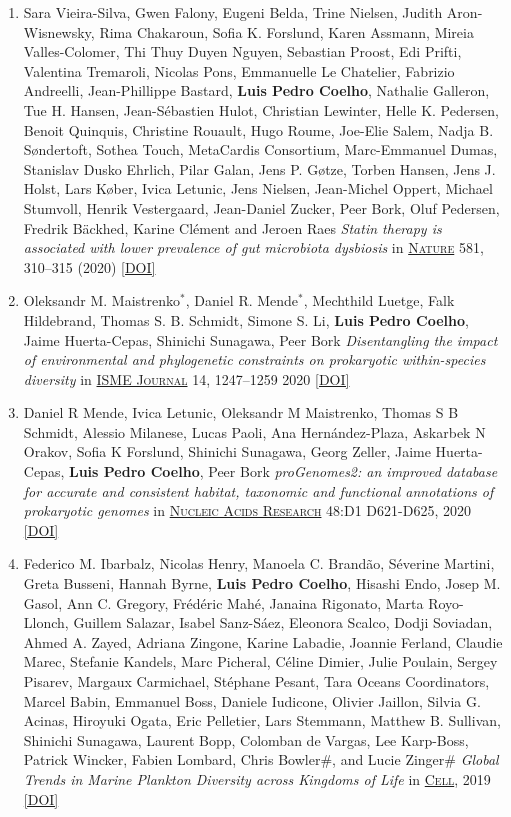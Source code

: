 \documentclass{article}
\newcommand\showdoi[1]{%
    \href{http://dx.doi.org/#1}{[DOI]}%
}
\newcommand\pubname[1]{\textsc{\uline{#1}}}
\newcommand\costar{${}^{*}$}
\begin{document}
\begin{enumerate}[resume]
\item Sara Vieira-Silva, Gwen Falony, Eugeni Belda, Trine Nielsen, Judith
Aron-Wisnewsky, Rima Chakaroun, Sofia K. Forslund, Karen Assmann, Mireia
Valles-Colomer, Thi Thuy Duyen Nguyen, Sebastian Proost, Edi Prifti, Valentina
Tremaroli, Nicolas Pons, Emmanuelle Le Chatelier, Fabrizio Andreelli,
Jean-Phillippe Bastard, \textbf{Luis Pedro Coelho}, Nathalie Galleron, Tue H.
Hansen, Jean-Sébastien Hulot, Christian Lewinter, Helle K. Pedersen, Benoit
Quinquis, Christine Rouault, Hugo Roume, Joe-Elie Salem, Nadja B. Søndertoft,
Sothea Touch, MetaCardis Consortium, Marc-Emmanuel Dumas, Stanislav Dusko
Ehrlich, Pilar Galan, Jens P. Gøtze, Torben Hansen, Jens J. Holst, Lars Køber,
Ivica Letunic, Jens Nielsen, Jean-Michel Oppert, Michael Stumvoll, Henrik
Vestergaard, Jean-Daniel Zucker, Peer Bork, Oluf Pedersen, Fredrik Bäckhed,
Karine Clément and Jeroen Raes \emph{Statin therapy is associated with lower
prevalence of gut microbiota dysbiosis} in \pubname{Nature} 581, 310–315 (2020)
\showdoi{10.1038/s41586-020-2269-x}

\item Oleksandr M. Maistrenko\costar,  Daniel R. Mende\costar,  Mechthild
Luetge, Falk Hildebrand,  Thomas S. B. Schmidt,  Simone S. Li, \textbf{Luis
Pedro Coelho},  Jaime Huerta-Cepas,  Shinichi Sunagawa,  Peer Bork
\emph{Disentangling the impact of environmental and phylogenetic constraints on
prokaryotic within-species diversity} in \pubname{ISME Journal} 14, 1247–1259
2020 \showdoi{10.1038/s41396-020-0600-z}

\item Daniel R Mende, Ivica Letunic, Oleksandr M Maistrenko, Thomas S B Schmidt,
Alessio Milanese, Lucas Paoli, Ana Hernández-Plaza, Askarbek N Orakov, Sofia K
Forslund, Shinichi Sunagawa, Georg Zeller, Jaime Huerta-Cepas, \textbf{Luis
Pedro Coelho}, Peer Bork \emph{proGenomes2: an improved database for accurate
and consistent habitat, taxonomic and functional annotations of prokaryotic
genomes} in \pubname{Nucleic Acids Research} 48:D1 D621-D625, 2020
\showdoi{10.1093/nar/gkz1002}

\item Federico M. Ibarbalz, Nicolas Henry, Manoela C. Brandão, Séverine
Martini, Greta Busseni, Hannah Byrne, \textbf{Luis Pedro Coelho}, Hisashi Endo,
Josep M. Gasol, Ann C. Gregory, Frédéric Mahé, Janaina Rigonato, Marta
Royo-Llonch, Guillem Salazar, Isabel Sanz-Sáez, Eleonora Scalco, Dodji
Soviadan, Ahmed A. Zayed, Adriana Zingone, Karine Labadie, Joannie Ferland,
Claudie Marec, Stefanie Kandels, Marc Picheral, Céline Dimier, Julie Poulain,
Sergey Pisarev, Margaux Carmichael, Stéphane Pesant, Tara Oceans Coordinators,
Marcel Babin, Emmanuel Boss, Daniele Iudicone, Olivier Jaillon, Silvia G.
Acinas, Hiroyuki Ogata, Eric Pelletier, Lars Stemmann, Matthew B. Sullivan,
Shinichi Sunagawa, Laurent Bopp, Colomban de Vargas, Lee Karp-Boss, Patrick
Wincker, Fabien Lombard, Chris Bowler\#, and Lucie Zinger\# \emph{Global Trends
in Marine Plankton Diversity across Kingdoms of Life} in \pubname{Cell}, 2019
\showdoi{10.1016/j.cell.2019.10.008}


\end{enumerate}
\end{document}
